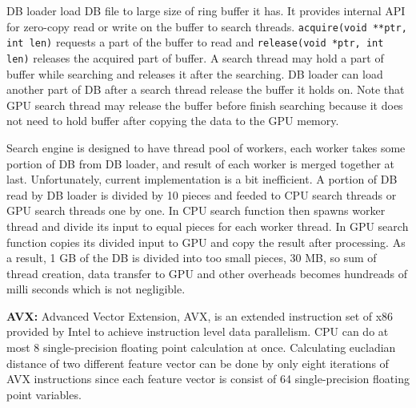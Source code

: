 

DB loader load DB file to large size of ring buffer it has.
It provides internal API for zero-copy read or write on the buffer to search threads.
{\tt acquire(void **ptr, int len)} requests a part of the buffer to read and {\tt release(void *ptr, int len)} releases the acquired part of buffer.
A search thread may hold a part of buffer while searching and releases it after the searching.
DB loader can load another part of DB after a search thread release the buffer it holds on.
Note that GPU search thread may release the buffer before finish searching because it does not need to hold buffer after copying the data to the GPU memory.

Search engine is designed to have thread pool of workers, each worker takes some portion of DB from DB loader, and result of each worker is merged together at last.
Unfortunately, current implementation is a bit inefficient.
A portion of DB read by DB loader is divided by 10 pieces and feeded to CPU search threads or GPU search threads one by one.
In CPU search function then spawns worker thread and divide its input to equal pieces for each worker thread.
In GPU search function copies its divided input to GPU and copy the result after processing.
As a result, 1 GB of the DB is divided into too small pieces, 30 MB, so sum of thread creation, data transfer to GPU and other overheads becomes hundreads of milli seconds which is not negligible.

\textbf{AVX:}
Advanced Vector Extension, AVX, is an extended instruction set of x86 provided by Intel to achieve instruction level data parallelism.
CPU can do at most 8 single-precision floating point calculation at once.
Calculating eucladian distance of two different feature vector can be done by only eight iterations of AVX instructions since each feature vector is consist of 64 single-precision floating point variables.


